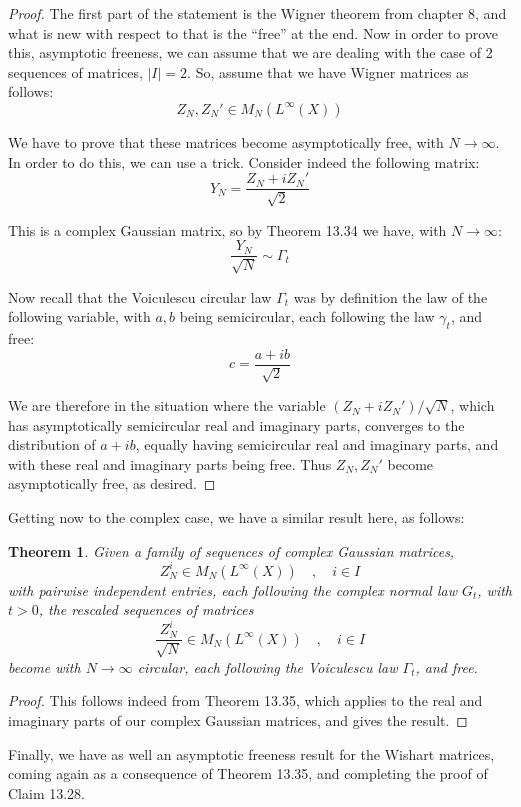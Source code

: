 \documentclass[12pt]{amsbook}
\newtheorem{theorem}{Theorem}[chapter]
\begin{document}
\begin{proof}
The first part of the statement is the Wigner theorem from chapter 8, and what is new with respect to that is the ``free'' at the end. Now in order to prove this, asymptotic freeness, we can assume that we are dealing with the case of 2 sequences of matrices, $|I|=2$. So, assume that we have Wigner matrices as follows:
$$Z_N,Z_N'\in M_N(L^\infty(X))$$

We have to prove that these matrices become asymptotically free, with $N\to\infty$. In order to do this, we can use a trick. Consider indeed the following matrix:
$$Y_N=\frac{Z_N+iZ_N'}{\sqrt{2}}$$

This is a complex Gaussian matrix, so by Theorem 13.34 we have, with $N\to\infty$:
$$\frac{Y_N}{\sqrt{N}}\sim\Gamma_t$$

Now recall that the Voiculescu circular law $\Gamma_t$ was by definition the law of the following variable, with $a,b$ being semicircular, each following the law $\gamma_t$, and free:
$$c=\frac{a+ib}{\sqrt{2}}$$

We are therefore in the situation where the variable $(Z_N+iZ_N')/\sqrt{N}$, which has asymptotically semicircular real and imaginary parts, converges to the distribution of $a+ib$, equally having semicircular real and imaginary parts, and with these real and imaginary parts being free. Thus $Z_N,Z_N'$ become asymptotically free, as desired.
\end{proof}

Getting now to the complex case, we have a similar result here, as follows:


\begin{theorem}
Given a family of sequences of complex Gaussian matrices, 
$$Z^i_N\in M_N(L^\infty(X))\quad,\quad i\in I$$
with pairwise independent entries, each following the complex normal law $G_t$, with $t>0$, the rescaled sequences of matrices
$$\frac{Z^i_N}{\sqrt{N}}\in M_N(L^\infty(X))\quad,\quad i\in I$$
become with $N\to\infty$ circular, each following the Voiculescu law $\Gamma_t$, and free.
\end{theorem}

\begin{proof}
This follows indeed from Theorem 13.35, which applies to the real and imaginary parts of our complex Gaussian matrices, and gives the result.
\end{proof}

Finally, we have as well an asymptotic freeness result for the Wishart matrices, coming again as a consequence of Theorem 13.35, and completing the proof of Claim 13.28.
\end{document}
